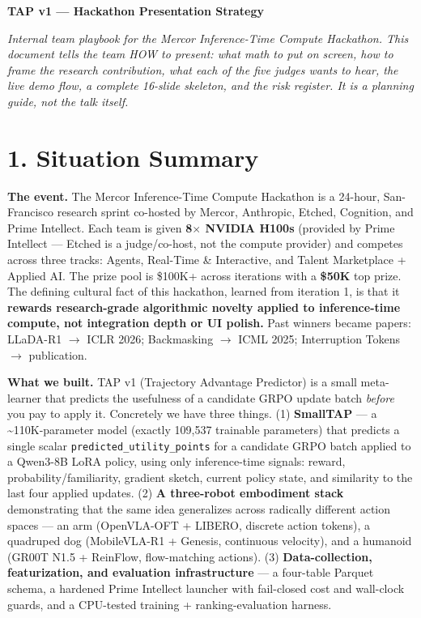 \documentclass[11pt,letterpaper]{article}
\begin{document}
\begin{center}
{\LARGE\bfseries TAP v1 --- Hackathon Presentation Strategy}
\end{center}

\emph{Internal team playbook for the Mercor Inference-Time Compute Hackathon. This document tells the team HOW to present: what math to put on screen, how to frame the research contribution, what each of the five judges wants to hear, the live demo flow, a complete 16-slide skeleton, and the risk register. It is a planning guide, not the talk itself.}

\medskip

\section*{1. Situation Summary}

\textbf{The event.} The Mercor Inference-Time Compute Hackathon is a 24-hour, San-Francisco research sprint co-hosted by Mercor, Anthropic, Etched, Cognition, and Prime Intellect. Each team is given \textbf{8$\times$ NVIDIA H100s} (provided by Prime Intellect --- Etched is a judge/co-host, not the compute provider) and competes across three tracks: Agents, Real-Time \& Interactive, and Talent Marketplace + Applied AI. The prize pool is \$100K+ across iterations with a \textbf{\$50K} top prize. The defining cultural fact of this hackathon, learned from iteration 1, is that it \textbf{rewards research-grade algorithmic novelty applied to inference-time compute, not integration depth or UI polish.} Past winners became papers: LLaDA-R1 $\rightarrow$ ICLR 2026; Backmasking $\rightarrow$ ICML 2025; Interruption Tokens $\rightarrow$ publication.

\textbf{What we built.} TAP v1 (Trajectory Advantage Predictor) is a small meta-learner that predicts the usefulness of a candidate GRPO update batch \emph{before} you pay to apply it. Concretely we have three things. (1) \textbf{SmallTAP} --- a \textasciitilde{}110K-parameter model (exactly 109,537 trainable parameters) that predicts a single scalar \texttt{predicted\_utility\_points} for a candidate GRPO batch applied to a Qwen3-8B LoRA policy, using only inference-time signals: reward, probability/familiarity, gradient sketch, current policy state, and similarity to the last four applied updates. (2) \textbf{A three-robot embodiment stack} demonstrating that the same idea generalizes across radically different action spaces --- an arm (OpenVLA-OFT + LIBERO, discrete action tokens), a quadruped dog (MobileVLA-R1 + Genesis, continuous velocity), and a humanoid (GR00T N1.5 + ReinFlow, flow-matching actions). (3) \textbf{Data-collection, featurization, and evaluation infrastructure} --- a four-table Parquet schema, a hardened Prime Intellect launcher with fail-closed cost and wall-clock guards, and a CPU-tested training + ranking-evaluation harness.
\end{document}
